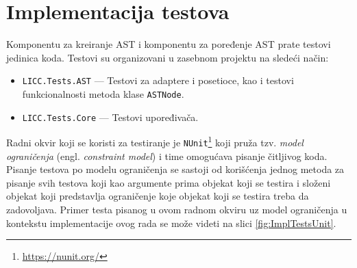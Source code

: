 \section{Implementacija testova}
\label{sec:ImplementationTests}

Komponentu za kreiranje AST i komponentu za poređenje AST prate testovi jedinica koda. Testovi su organizovani u zasebnom projektu na sledeći način:
\begin{itemize}
    \item \texttt{LICC.Tests.AST} --- Testovi za adaptere i posetioce, kao i testovi funkcionalnosti metoda klase \texttt{ASTNode}.
    \item \texttt{LICC.Tests.Core} --- Testovi upoređivača.
\end{itemize}

Radni okvir koji se koristi za testiranje je \texttt{NUnit}\footnote{\url{https://nunit.org/}} koji pruža tzv. \emph{model ograničenja} (engl. \emph{constraint model}) i time omogućava pisanje čitljivog koda. Pisanje testova po modelu ograničenja se sastoji od korišćenja jednog metoda za pisanje svih testova koji kao argumente prima objekat koji se testira i složeni objekat koji predstavlja ograničenje koje objekat koji se testira treba da zadovoljava. Primer testa pisanog u ovom radnom okviru uz model ograničenja u kontekstu implementacije ovog rada se može videti na slici \ref{fig:ImplTestsUnit}.

